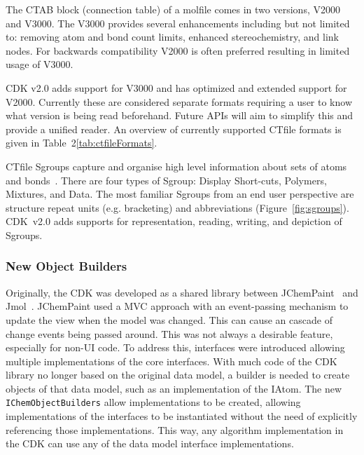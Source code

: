 \documentclass[doublespacing]{bmcart}
\def \cdkversion {v2.0}
\begin{document}
The CTAB block (connection table) of a molfile comes in two versions, V2000
and V3000. The V3000 provides several enhancements including but not
limited to: removing atom and bond count limits, enhanced stereochemistry,
and link nodes. For backwards compatibility V2000 is often preferred resulting
in limited usage of V3000.

CDK \cdkversion{} adds support for V3000 and has optimized and extended
support for V2000. Currently these are considered separate formats requiring
a user to know what version is being read beforehand. Future APIs will aim
to simplify this and provide a unified reader. An overview of currently
supported CTfile formats is given in Table~2\ref{tab:ctfileFormats}.

CTfile Sgroups capture and organise high level information about sets of atoms
and bonds~\cite{Gushurst91}. There are four types of Sgroup: Display Short-cuts, Polymers,
Mixtures, and Data. The most familiar Sgroups from an end user perspective are structure 
repeat units (e.g. bracketing) and abbreviations (Figure~\ref{fig:sgroups}).
CDK~\cdkversion{} adds supports for representation, reading, writing, and depiction of Sgroups.


\subsubsection*{New Object Builders}

Originally, the CDK was developed as a shared library between
JChemPaint~\cite{krause2000jchempaint} and
Jmol~\cite{Willighagen2007jmol,Hanson2010}.  JChemPaint used a MVC
approach with an event-passing mechanism to update the view when the
model was changed. This can cause an cascade of change events being
passed around. This was not always a desirable feature, especially for
non-UI code. To address this, interfaces were introduced allowing
multiple implementations of the core interfaces. With much code of the CDK
library no longer based on the original data model, a builder is needed to
create objects of that data model, such as an implementation of the IAtom.
The new \texttt{IChemObjectBuilders} allow implementations to be created, allowing
implementations of the interfaces to be instantiated without the need
of explicitly referencing those implementations. This way, any algorithm
implementation in the CDK can use any of the data model interface
implementations.
\end{document}
